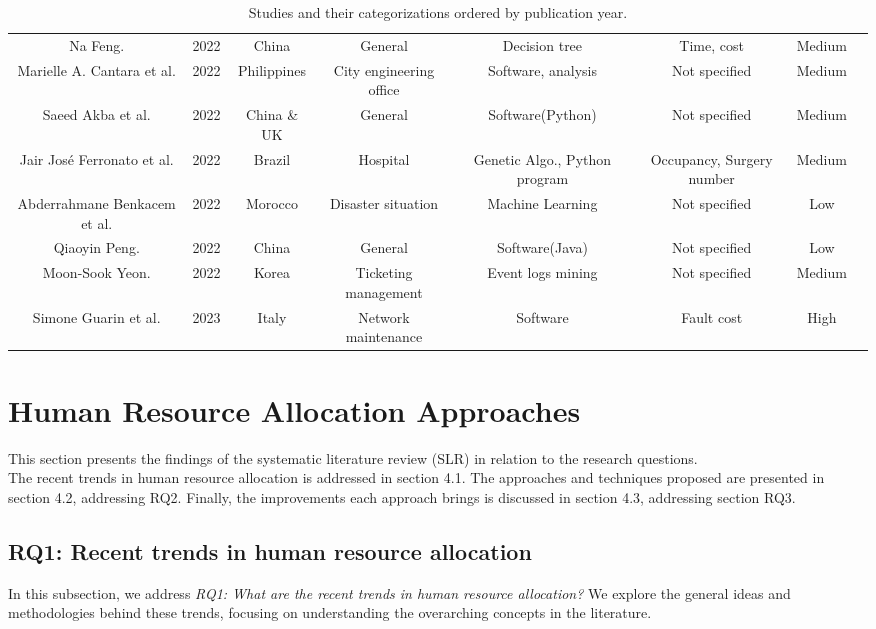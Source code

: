 \documentclass[runningheads]{llncs}
\begin{document}
\begin{sidewaystable}
\begin{tabular}{cccccccc}
Na Feng.\cite{study5} & 2022 & China & General & Decision tree & Time, cost & Medium\\

Marielle A. Cantara et al.\cite{study6} & 2022 & Philippines & City engineering office & Software, analysis & Not specified & Medium\\

Saeed Akba et al.\cite{study7} & 2022 & China \& UK & General & Software(Python) & Not specified & Medium\\

Jair José Ferronato et al.\cite{study8} & 2022 & Brazil & Hospital & Genetic Algo., Python program & Occupancy, Surgery number  & Medium & \\

Abderrahmane Benkacem et al.\cite{study9} & 2022 & Morocco & Disaster situation & Machine Learning & Not specified & Low \\

Qiaoyin Peng.\cite{study10} & 2022 & China & General & Software(Java) & Not specified & Low \\

Moon-Sook Yeon.\cite{study11} & 2022 & Korea & Ticketing management & Event logs mining & Not specified & Medium\\
Simone Guarin et al.\cite{study1} & 2023 & Italy & Network maintenance & Software & Fault cost & High\\


\hline
\end{tabular}
\caption{Studies and their categorizations ordered by publication year.}
\end{sidewaystable} %



\section{Human Resource Allocation Approaches}
This section presents the findings of the systematic literature review (SLR) in relation to the research questions.\\
The recent trends in human resource allocation is addressed in section 4.1. The approaches and techniques proposed are presented in section 4.2, addressing RQ2. Finally, the improvements each approach brings is discussed in section 4.3, addressing section RQ3.

\subsection{RQ1: Recent trends in human resource allocation}
In this subsection, we address \emph{RQ1: What are the recent trends in human resource allocation?} We explore the general ideas and methodologies behind these trends, focusing on understanding the overarching concepts in the literature.
\end{document}
